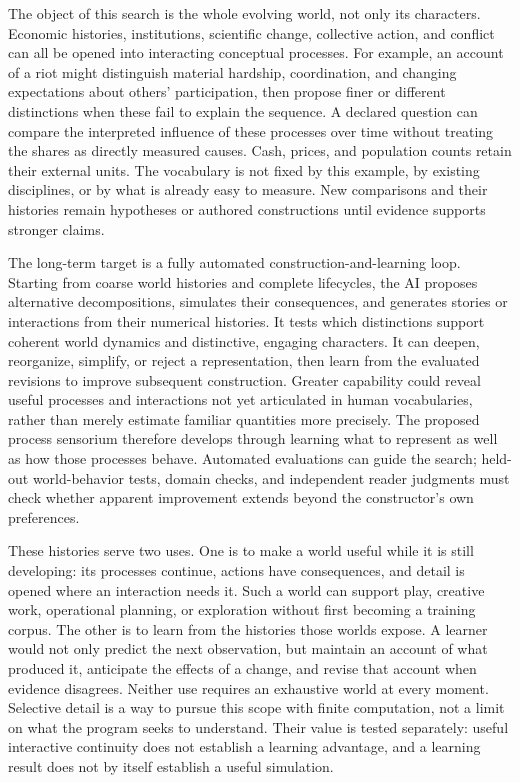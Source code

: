 \documentclass[10pt]{article}
\begin{document}
The object of this search is the whole evolving world, not only its
characters. Economic histories, institutions, scientific change, collective
action, and conflict can all be opened into interacting conceptual processes.
For example, an account of a riot might distinguish material hardship,
coordination, and changing expectations about others' participation, then
propose finer or different distinctions when these fail to explain the
sequence. A declared question can compare the interpreted influence of these
processes over time without treating the shares as directly measured causes.
Cash, prices, and population counts retain their external units. The vocabulary
is not fixed by this example, by existing disciplines, or by what is already
easy to measure. New comparisons and their histories remain hypotheses or
authored constructions until evidence supports stronger claims.

The long-term target is a fully automated construction-and-learning loop.
Starting from coarse world histories and complete lifecycles, the AI proposes
alternative decompositions, simulates their consequences, and generates
stories or interactions from their numerical histories. It tests which
distinctions support coherent world dynamics and distinctive, engaging
characters. It can deepen, reorganize, simplify, or
reject a representation, then learn from the evaluated revisions to improve
subsequent construction. Greater capability could reveal useful processes and
interactions not yet articulated in human vocabularies, rather than merely
estimate familiar quantities more precisely. The proposed process sensorium
therefore develops through learning what to represent as well as how those
processes behave. Automated evaluations can guide the search; held-out
world-behavior tests, domain checks, and independent reader judgments must
check whether apparent improvement extends beyond the constructor's own
preferences.

These histories serve two uses. One is to make a world useful while it is still
developing: its processes continue, actions have consequences, and detail is
opened where an interaction needs it. Such a world can support play, creative
work, operational planning, or exploration without first becoming a training
corpus. The other is to learn from the histories those worlds expose. A learner would not only predict
the next observation, but maintain an account of what produced it, anticipate
the effects of a change, and revise that account when evidence disagrees.
Neither use requires an exhaustive world at every moment. Selective detail is
a way to pursue this scope with finite computation, not a limit on what the
program seeks to understand. Their value is tested separately:
useful interactive continuity does not establish a learning advantage, and a
learning result does not by itself establish a useful simulation.
\end{document}
